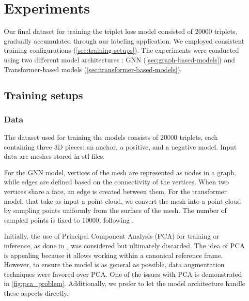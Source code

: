 \chapter{Experiments}
\label{sec:experiments}

Our final dataset for training the triplet loss model consisted of 20000 triplets, gradually accumulated through our labeling application. We employed consistent training configurations (\autoref{sec:training-setups}). The experiments were conducted using two different model architectures : GNN (\autoref{sec:graph-based-models}) and Transformer-based models (\autoref{sec:transformer-based-models}). 

\section{Training setups}
\label{sec:training-setups}

\subsection{Data}

The dataset used for training the models consists of 20000 triplets, each containing three 3D pieces: an anchor, a positive, and a negative model. Input data are meshes stored in stl files.

For the GNN model, vertices of the mesh are represented as nodes in a graph, while edges are defined based on the connectivity of the vertices. When two vertices share a face, an edge is created between them. 
For the transformer model, that take as input a point cloud, we convert the mesh into a point cloud by sampling points uniformly from the surface of the mesh. The number of sampled points is fixed to 10000, following \cite{liuOpenShapeScaling3D2023}.

Initially, the use of Principal Component Analysis (PCA) for training or inference, as done in \cite{popRotationInvariantGraph2023}, was considered but ultimately discarded. The idea of PCA is appealing because it allows working within a canonical reference frame. However, to ensure the model is as general as possible, data augmentation techniques were favored over PCA. One of the issues with PCA is demonstrated in \autoref{fig:pca_problem}. Additionally, we prefer to let the model architecture handle these aspects directly.

